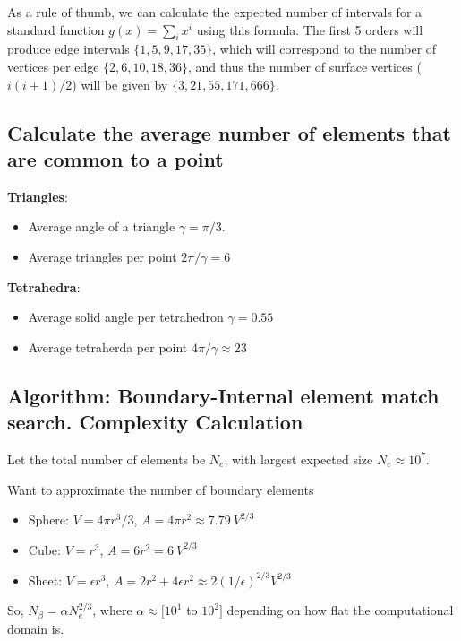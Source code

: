 \documentclass[12pt]{article}
\begin{document}
\noindent
As a rule of thumb, we can calculate the expected number of intervals for a standard function $g(x) = \sum_i x^i$ using this formula. The first 5 orders will produce edge intervals $\{ 1, 5, 9, 17, 35\}$, which will correspond to the number of vertices per edge $\{ 2, 6, 10, 18, 36\}$, and thus the number of surface vertices ($i(i+1)/2$) will be given by $\{3, 21, 55, 171, 666\}$.












\appendix

\subsection{Calculate the average number of elements that are common to a point}

\textbf{Triangles}:
\begin{itemize}
	\item Average angle of a triangle $\gamma = \pi/3$.
	\item Average triangles per point $2\pi / \gamma = 6$
\end{itemize}
\noindent
\textbf{Tetrahedra}:
\begin{itemize}
	\item Average solid angle per tetrahedron $\gamma = 0.55$
	\item Average tetraherda per point $4\pi / \gamma \approx 23$
\end{itemize}

\subsection{Algorithm: Boundary-Internal element match search. Complexity Calculation}

\noindent
Let the total number of elements be $N_e$, with largest expected size $N_e \approx 10^7$.

\noindent
Want to approximate the number of boundary elements
\begin{itemize}
	\item Sphere: $V = 4\pi r^3 / 3$, $A = 4\pi r^2 \approx 7.79\ V^{2/3}$
	\item Cube: $V = r^3$, $A = 6 r^2 = 6\ V^{2/3}$
	\item Sheet: $V = \epsilon r^3$, $A = 2 r^2 + 4\epsilon r^2 \approx 2(1/\epsilon)^{2/3} V^{2/3}$
\end{itemize}
\noindent
So, $N_{\beta} = \alpha N_e^{2/3}$, where $\alpha \approx [10^1$ to $10^2]$ depending on how flat the computational domain is. \\
\end{document}
